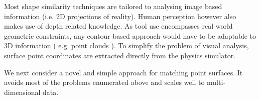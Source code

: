 \documentclass{article}
\begin{document}
Most shape similarity techniques are tailored to analysing image based information (i.e. 2D projections of reality).
Human perception however also makes use of depth related knowledge.
As tool use encompasses real world geometric constraints, any contour based approach would have to be adaptable to 3D information ( e.g. point clouds ).
To simplify the problem of visual analysis, surface point coordinates are extracted directly from the physics simulator. 

We next consider a novel and simple approach for matching point surfaces. It avoids most of the problems enumerated above and scales well to multi-dimensional data.  
\end{document}
